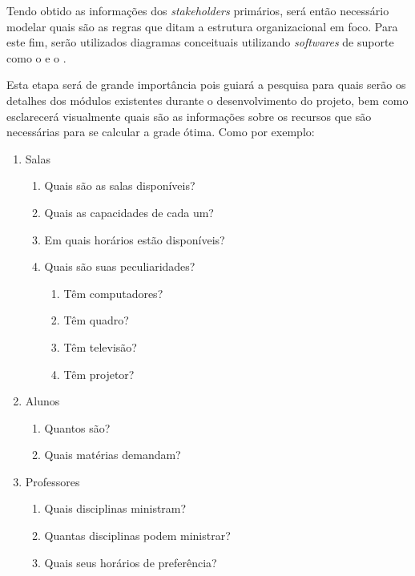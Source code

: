 Tendo obtido as informações dos \textit{stakeholders} primários, será então necessário modelar quais são as regras que ditam a estrutura organizacional em foco. Para este fim, serão utilizados diagramas conceituais utilizando \textit{softwares} de suporte como o  e o .


Esta etapa será de grande importância pois guiará a pesquisa para quais serão os detalhes dos módulos existentes durante o desenvolvimento do projeto, bem como esclarecerá visualmente quais são as informações sobre os recursos que são necessárias para se calcular a grade ótima. Como por exemplo:

\begin{enumerate}
  \item Salas
        \begin{enumerate}
          \item Quais são as salas disponíveis?
          \item Quais as capacidades de cada um?
          \item Em quais horários estão disponíveis?
          \item Quais são suas peculiaridades?
                \begin{enumerate}
                  \item Têm computadores?
                  \item Têm quadro?
                  \item Têm televisão?
                  \item Têm projetor?
                \end{enumerate}
        \end{enumerate}
  \item Alunos
        \begin{enumerate}
          \item Quantos são?
          \item Quais matérias demandam?
        \end{enumerate}
  \item Professores
        \begin{enumerate}
          \item Quais disciplinas ministram?
          \item Quantas disciplinas podem ministrar?
          \item Quais seus horários de preferência?
        \end{enumerate}
\end{enumerate}

